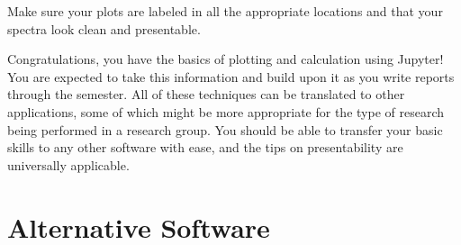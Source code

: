 \documentclass[nobib,nofonts,nols,nohyper]{tufte-handout}
\begin{document}
Make sure your plots are labeled in all the appropriate locations and that your spectra look clean and presentable.

Congratulations, you have the basics of plotting and calculation using Jupyter! 
You are expected to take this information and build upon it as you write reports through the semester. 
All of these techniques can be translated to other applications, some of which might be more appropriate for the type of research being performed in a research group. 
You should be able to transfer your basic skills to any other software with ease, and the tips on presentability are universally applicable.


\section{Alternative Software} %
\label{alternative-software}
\end{document}
